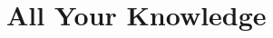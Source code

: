 \documentclass[a4paper]{scrartcl}
\begin{document}
\newpage
\tableofcontents

\newpage

\part{All Your Knowledge}














\givetotalpoints
\end{document}
